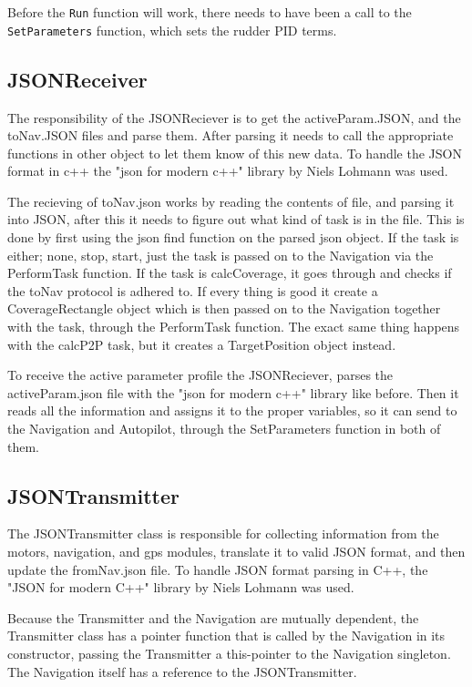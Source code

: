 Before the \texttt{Run} function will work, there needs to have been a call to the \texttt{SetParameters} function, which sets the rudder PID terms. 

\subsection{JSONReceiver}
The responsibility of the JSONReciever is to get the activeParam.JSON, and the toNav.JSON files and parse them. After parsing it needs to call the appropriate functions in other object to let them know of this new data. To handle the JSON format in c++ the "json for modern c++" library by Niels Lohmann was used\cite{json}. 

The recieving of toNav.json works by reading the contents of file, and parsing it into JSON, after this it needs to figure out what kind of task is in the file. This is done by first using the json find function on the parsed json object. If the task is either; none, stop, start, just the task is passed on to the Navigation via the PerformTask function. If the task is calcCoverage, it goes through and checks if the toNav protocol is adhered to. If every thing is good it create a CoverageRectangle object which is then passed on to the Navigation together with the task, through the PerformTask function.
The exact same thing happens with the calcP2P task, but it creates a TargetPosition object instead.

To receive the active parameter profile the JSONReciever, parses the activeParam.json file with the "json for modern c++" library like before. Then it reads all the information and assigns it to the proper variables, so it can send to the Navigation and Autopilot, through the SetParameters function in both of them.

\subsection{JSONTransmitter}
The  JSONTransmitter class is responsible for collecting information from the motors, navigation, and gps modules, translate it to valid JSON format, and then update the fromNav.json file. To handle JSON format parsing in C++, the "JSON for modern C++" library by Niels Lohmann was used\cite{json}. 

Because the Transmitter and the Navigation are mutually dependent, the Transmitter class has a pointer function that is called by the Navigation in its constructor, passing the Transmitter a this-pointer to the Navigation singleton. The Navigation itself has a reference to the JSONTransmitter.

